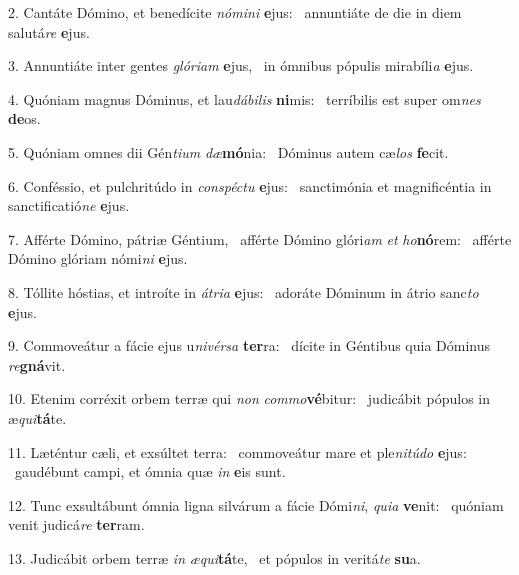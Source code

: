 2. Cantáte Dómino, et benedícite \textit{nó}\textit{mi}\textit{ni} \textbf{e}jus: \ast\  annuntiáte de die in diem salutá\textit{re} \textbf{e}jus.\

3. Annuntiáte inter gentes \textit{gló}\textit{ri}\textit{am} \textbf{e}jus, \ast\  in ómnibus pópulis mirabíli\textit{a} \textbf{e}jus.\

4. Quóniam magnus Dóminus, et lau\textit{dá}\textit{bi}\textit{lis} \textbf{ni}mis: \ast\  terríbilis est super om\textit{nes} \textbf{de}os.\

5. Quóniam omnes dii Gén\textit{ti}\textit{um} \textit{dæ}\textbf{mó}nia: \ast\  Dóminus autem cæ\textit{los} \textbf{fe}cit.\

6. Conféssio, et pulchritúdo in \textit{con}\textit{spéc}\textit{tu} \textbf{e}jus: \ast\  sanctimónia et magnificéntia in sanctificatió\textit{ne} \textbf{e}jus.\

7. Afférte Dómino, pátriæ Géntium, \dag\  afférte Dómino glóri\textit{am} \textit{et} \textit{ho}\textbf{nó}rem: \ast\  afférte Dómino glóriam nómi\textit{ni} \textbf{e}jus.\

8. Tóllite hóstias, et introíte in \textit{á}\textit{tri}\textit{a} \textbf{e}jus: \ast\  adoráte Dóminum in átrio sanc\textit{to} \textbf{e}jus.\

9. Commoveátur a fácie ejus u\textit{ni}\textit{vér}\textit{sa} \textbf{ter}ra: \ast\  dícite in Géntibus quia Dóminus \textit{re}\textbf{gná}vit.\

10. Etenim corréxit orbem terræ qui \textit{non} \textit{com}\textit{mo}\textbf{vé}bitur: \ast\  judicábit pópulos in æ\textit{qui}\textbf{tá}te.\

11. Læténtur cæli, et exsúltet terra: \dag\  commoveátur mare et ple\textit{ni}\textit{tú}\textit{do} \textbf{e}jus: \ast\  gaudébunt campi, et ómnia quæ \textit{in} \textbf{e}is sunt.\

12. Tunc exsultábunt ómnia ligna silvárum a fácie Dómi\textit{ni}, \textit{qui}\textit{a} \textbf{ve}nit: \ast\  quóniam venit judicá\textit{re} \textbf{ter}ram.\

13. Judicábit orbem terræ \textit{in} \textit{æ}\textit{qui}\textbf{tá}te, \ast\  et pópulos in veritá\textit{te} \textbf{su}a.\

